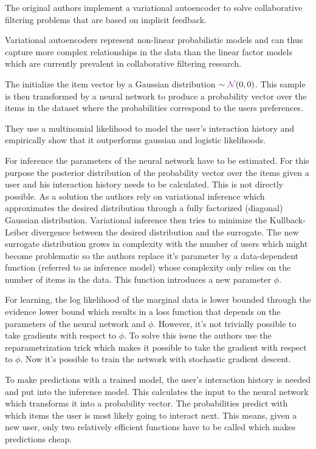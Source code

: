 The original authors implement a variational autoencoder to solve collaborative filtering problems that are based on implicit feedback.

Variational autoencoders represent non-linear probabilistic models and can thus capture more complex relationships in the data than the linear factor models which are currently prevalent in collaborative filtering research.

The initialize the item vector by a Gaussian distribution $\distas\Normaldist(0,0)$.
This sample is then transformed by a neural network to produce a probability vector over the items in the dataset where the
probabilities correspond to the users
preferences. 

They use a multinomial likelihood to model the user's interaction history and empirically show that it outperforms gaussian and logistic likelihoods. 

For inference the parameters of the neural network have to be estimated. For this purpose the posterior distribution of the probability
vector over the items given a user and his interaction history needs to be calculated. This is not directly possible. As a solution the authors rely on variational inference which approximates the desired distribution through a fully factorized (diagonal) Gaussian distribution. Variational inference then tries to minimize the Kullback-Leiber divergence between the desired distribution and the surrogate. The new surrogate distribution grows in complexity with the number of users which might become problematic so the authors replace it's parameter by a data-dependent function (referred to as inference model) whose complexity only relies on the number of items in the data. This function introduces a new parameter $\phi$.

For learning, the log likelihood of the marginal data is lower bounded through the evidence lower bound which results in a loss function that depends on the parameters of the neural network and $\phi$. However, it's not trivially possible to take gradients with respect to $\phi$. To solve this issue the authors use the reparametrization trick which makes it possible to take the gradient with respect to $\phi$. Now it's possible to train the network with stochastic gradient descent.

To make predictions with a trained model, the user's interaction history is needed and put into the inference model. This calculates the input to the neural network which transforms it into a probability vector. The probabilities predict with which items the user is most likely going to interact next. This means, given a new user, only two relatively efficient functions have to be called which makes predictions cheap.

